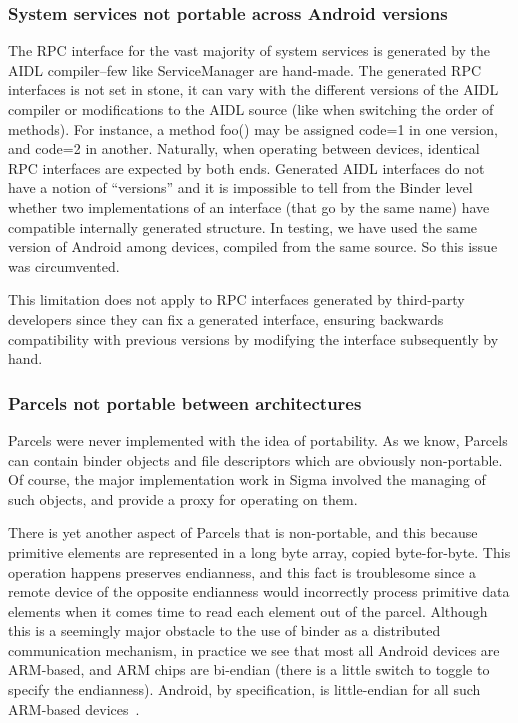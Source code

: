 \documentclass[prodmode]{acmlarge}
\begin{document}
\subsubsection{System services not portable across Android versions}
The RPC interface for the vast majority of system services is generated by the AIDL compiler--few like ServiceManager are hand-made. The generated RPC interfaces is not set in stone, it can vary with the different versions of the AIDL compiler or modifications to the AIDL source (like when switching the order of methods). For instance, a method foo() may be assigned code=1 in one version, and code=2 in another. Naturally, when operating between devices, identical RPC interfaces are expected by both ends. Generated AIDL interfaces do not have a notion of ``versions'' and it is impossible to tell from the Binder level whether two implementations of an interface (that go by the same name) have compatible internally generated structure. In testing, we have used the same version of Android among devices, compiled from the same source. So this issue was circumvented.

This limitation does not apply to RPC interfaces generated by third-party developers since they can fix a generated interface, ensuring backwards compatibility with previous versions by modifying the interface subsequently by hand.

\subsubsection{Parcels not portable between architectures}
Parcels were never implemented with the idea of portability. As we know, Parcels can contain binder objects and file descriptors which are obviously non-portable. Of course, the major implementation work in Sigma involved the managing of such objects, and provide a proxy for operating on them.

There is yet another aspect of Parcels that is non-portable, and this because primitive elements are represented in a long byte array, copied byte-for-byte. This operation happens preserves endianness, and this fact is troublesome since a remote device of the opposite endianness would incorrectly process primitive data elements when it comes time to read each element out of the parcel. Although this is a seemingly major obstacle to the use of binder as a distributed communication mechanism, in practice we see that most all Android devices are ARM-based, and ARM chips are bi-endian (there is a little switch to toggle to specify the endianness). Android, by specification, is little-endian for all such ARM-based devices~\cite{ARMLittleEndian}.
\end{document}

